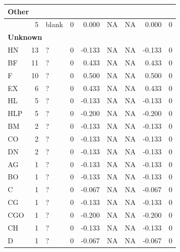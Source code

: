 \documentclass[
  letterpaper,
  DIV=11,
  numbers=noendperiod]{scrreprt}
\begin{document}
\begin{tabular}[t]{l|r|l|r|r|r|r|r|r}
\hline
\multicolumn{9}{l}{\textbf{Other}}\\
\hline
\hspace{1em} & 5 & blank & 0 & 0.000 & NA & NA & 0.000 & 0\\
\hline
\multicolumn{9}{l}{\textbf{Unknown}}\\
\hline
\hspace{1em}HN & 13 & ? & 0 & -0.133 & NA & NA & -0.133 & 0\\
\hline
\hspace{1em}BF & 11 & ? & 0 & 0.433 & NA & NA & 0.433 & 0\\
\hline
\hspace{1em}F & 10 & ? & 0 & 0.500 & NA & NA & 0.500 & 0\\
\hline
\hspace{1em}EX & 6 & ? & 0 & 0.433 & NA & NA & 0.433 & 0\\
\hline
\hspace{1em}HL & 5 & ? & 0 & -0.133 & NA & NA & -0.133 & 0\\
\hline
\hspace{1em}HLP & 5 & ? & 0 & -0.200 & NA & NA & -0.200 & 0\\
\hline
\hspace{1em}BM & 2 & ? & 0 & -0.133 & NA & NA & -0.133 & 0\\
\hline
\hspace{1em}CO & 2 & ? & 0 & -0.133 & NA & NA & -0.133 & 0\\
\hline
\hspace{1em}DN & 2 & ? & 0 & -0.133 & NA & NA & -0.133 & 0\\
\hline
\hspace{1em}AG & 1 & ? & 0 & -0.133 & NA & NA & -0.133 & 0\\
\hline
\hspace{1em}BO & 1 & ? & 0 & -0.133 & NA & NA & -0.133 & 0\\
\hline
\hspace{1em}C & 1 & ? & 0 & -0.067 & NA & NA & -0.067 & 0\\
\hline
\hspace{1em}CG & 1 & ? & 0 & -0.133 & NA & NA & -0.133 & 0\\
\hline
\hspace{1em}CGO & 1 & ? & 0 & -0.200 & NA & NA & -0.200 & 0\\
\hline
\hspace{1em}CH & 1 & ? & 0 & -0.133 & NA & NA & -0.133 & 0\\
\hline
\hspace{1em}D & 1 & ? & 0 & -0.067 & NA & NA & -0.067 & 0\\

\end{tabular}
\end{document}
